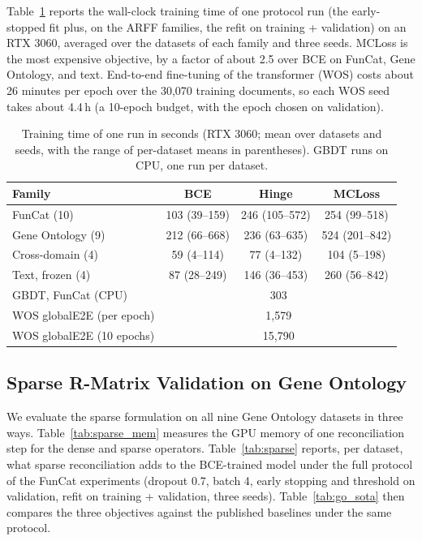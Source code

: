\documentclass[preprint,12pt]{elsarticle}
\begin{document}
Table~\ref{tab:gpu} reports the wall-clock training time of one protocol run
(the early-stopped fit plus, on the ARFF families, the refit on training +
validation) on an RTX 3060, averaged over the datasets of each family and
three seeds.  MCLoss is the most expensive objective, by a factor of about
2.5 over BCE on FunCat, Gene Ontology, and text.  End-to-end fine-tuning of
the transformer (WOS) costs about 26 minutes per epoch over the 30,070
training documents, so each WOS seed takes about 4.4\,h (a 10-epoch budget,
with the epoch chosen on validation).

\begin{table}[!ht]
\centering
\caption{Training time of one run in seconds (RTX 3060; mean over datasets and
seeds, with the range of per-dataset means in parentheses).  GBDT runs on CPU,
one run per dataset.}
\label{tab:gpu}
\begin{tabular}{lccc}
\toprule
\textbf{Family} & \textbf{BCE} & \textbf{Hinge} & \textbf{MCLoss} \\
\midrule
FunCat (10)        & 103 (39--159) & 246 (105--572) & 254 (99--518) \\
Gene Ontology (9)  & 212 (66--668) & 236 (63--635)  & 524 (201--842) \\
Cross-domain (4)   & 59 (4--114)   & 77 (4--132)    & 104 (5--198) \\
Text, frozen (4)   & 87 (28--249)  & 146 (36--453)  & 260 (56--842) \\
\midrule
GBDT, FunCat (CPU) & \multicolumn{3}{c}{303} \\
WOS globalE2E (per epoch) & \multicolumn{3}{c}{1,579} \\
WOS globalE2E (10 epochs) & \multicolumn{3}{c}{15,790} \\
\bottomrule
\end{tabular}
\end{table}

\subsection{Sparse R-Matrix Validation on Gene Ontology}
\label{sec:go_results}

We evaluate the sparse formulation on all nine Gene Ontology datasets
in three ways.  Table~\ref{tab:sparse_mem} measures the GPU memory of
one reconciliation step for the dense and sparse operators.
Table~\ref{tab:sparse} reports, per dataset, what sparse reconciliation
adds to the BCE-trained model under the full protocol of the FunCat
experiments (dropout 0.7, batch 4, early
stopping and threshold on validation, refit on training + validation,
three seeds).  Table~\ref{tab:go_sota} then compares the three
objectives against the published baselines under the same protocol.
\end{document}
